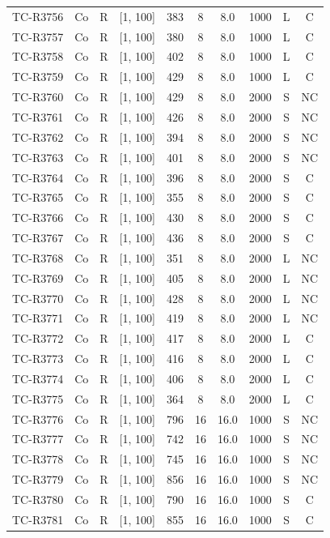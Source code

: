 \begin{longtable}{lccccccccc}
TC-R3756 & Co & R & [1, 100] & 383 & 8 & 8.0 & 1000 & L & C \\
TC-R3757 & Co & R & [1, 100] & 380 & 8 & 8.0 & 1000 & L & C \\
TC-R3758 & Co & R & [1, 100] & 402 & 8 & 8.0 & 1000 & L & C \\
TC-R3759 & Co & R & [1, 100] & 429 & 8 & 8.0 & 1000 & L & C \\
TC-R3760 & Co & R & [1, 100] & 429 & 8 & 8.0 & 2000 & S & NC \\
TC-R3761 & Co & R & [1, 100] & 426 & 8 & 8.0 & 2000 & S & NC \\
TC-R3762 & Co & R & [1, 100] & 394 & 8 & 8.0 & 2000 & S & NC \\
TC-R3763 & Co & R & [1, 100] & 401 & 8 & 8.0 & 2000 & S & NC \\
TC-R3764 & Co & R & [1, 100] & 396 & 8 & 8.0 & 2000 & S & C \\
TC-R3765 & Co & R & [1, 100] & 355 & 8 & 8.0 & 2000 & S & C \\
TC-R3766 & Co & R & [1, 100] & 430 & 8 & 8.0 & 2000 & S & C \\
TC-R3767 & Co & R & [1, 100] & 436 & 8 & 8.0 & 2000 & S & C \\
TC-R3768 & Co & R & [1, 100] & 351 & 8 & 8.0 & 2000 & L & NC \\
TC-R3769 & Co & R & [1, 100] & 405 & 8 & 8.0 & 2000 & L & NC \\
TC-R3770 & Co & R & [1, 100] & 428 & 8 & 8.0 & 2000 & L & NC \\
TC-R3771 & Co & R & [1, 100] & 419 & 8 & 8.0 & 2000 & L & NC \\
TC-R3772 & Co & R & [1, 100] & 417 & 8 & 8.0 & 2000 & L & C \\
TC-R3773 & Co & R & [1, 100] & 416 & 8 & 8.0 & 2000 & L & C \\
TC-R3774 & Co & R & [1, 100] & 406 & 8 & 8.0 & 2000 & L & C \\
TC-R3775 & Co & R & [1, 100] & 364 & 8 & 8.0 & 2000 & L & C \\
TC-R3776 & Co & R & [1, 100] & 796 & 16 & 16.0 & 1000 & S & NC \\
TC-R3777 & Co & R & [1, 100] & 742 & 16 & 16.0 & 1000 & S & NC \\
TC-R3778 & Co & R & [1, 100] & 745 & 16 & 16.0 & 1000 & S & NC \\
TC-R3779 & Co & R & [1, 100] & 856 & 16 & 16.0 & 1000 & S & NC \\
TC-R3780 & Co & R & [1, 100] & 790 & 16 & 16.0 & 1000 & S & C \\
TC-R3781 & Co & R & [1, 100] & 855 & 16 & 16.0 & 1000 & S & C \\

\end{longtable}

